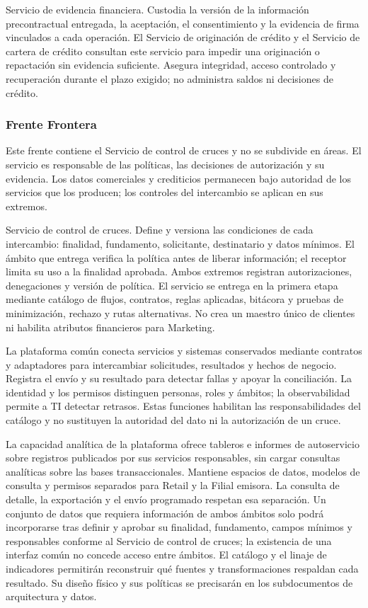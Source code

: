 \documentclass[11pt]{article}
\begin{document}
{Servicio de evidencia financiera. Custodia la versión de la información precontractual entregada, la aceptación, el consentimiento y la evidencia de firma vinculados a cada operación. El Servicio de originación de crédito y el Servicio de cartera de crédito consultan este servicio para impedir una originación o repactación sin evidencia suficiente. Asegura integridad, acceso controlado y recuperación durante el plazo exigido; no administra saldos ni decisiones de crédito.}

\subsubsection{Frente Frontera}

{Este frente contiene el Servicio de control de cruces y no se subdivide en áreas. El servicio es responsable de las políticas, las decisiones de autorización y su evidencia. Los datos comerciales y crediticios permanecen bajo autoridad de los servicios que los producen; los controles del intercambio se aplican en sus extremos.}


{Servicio de control de cruces. Define y versiona las condiciones de cada intercambio: finalidad, fundamento, solicitante, destinatario y datos mínimos. El ámbito que entrega verifica la política antes de liberar información; el receptor limita su uso a la finalidad aprobada. Ambos extremos registran autorizaciones, denegaciones y versión de política. El servicio se entrega en la primera etapa mediante catálogo de flujos, contratos, reglas aplicadas, bitácora y pruebas de minimización, rechazo y rutas alternativas. No crea un maestro único de clientes ni habilita atributos financieros para Marketing.}

{La plataforma común conecta servicios y sistemas conservados mediante contratos y adaptadores para intercambiar solicitudes, resultados y hechos de negocio. Registra el envío y su resultado para detectar fallas y apoyar la conciliación. La identidad y los permisos distinguen personas, roles y ámbitos; la observabilidad permite a TI detectar retrasos. Estas funciones habilitan las responsabilidades del catálogo y no sustituyen la autoridad del dato ni la autorización de un cruce.}

{La capacidad analítica de la plataforma ofrece tableros e informes de autoservicio sobre registros publicados por sus servicios responsables, sin cargar consultas analíticas sobre las bases transaccionales. Mantiene espacios de datos, modelos de consulta y permisos separados para Retail y la Filial emisora. La consulta de detalle, la exportación y el envío programado respetan esa separación. Un conjunto de datos que requiera información de ambos ámbitos solo podrá incorporarse tras definir y aprobar su finalidad, fundamento, campos mínimos y responsables conforme al Servicio de control de cruces; la existencia de una interfaz común no concede acceso entre ámbitos. El catálogo y el linaje de indicadores permitirán reconstruir qué fuentes y transformaciones respaldan cada resultado. Su diseño físico y sus políticas se precisarán en los subdocumentos de arquitectura y datos.}
\end{document}
